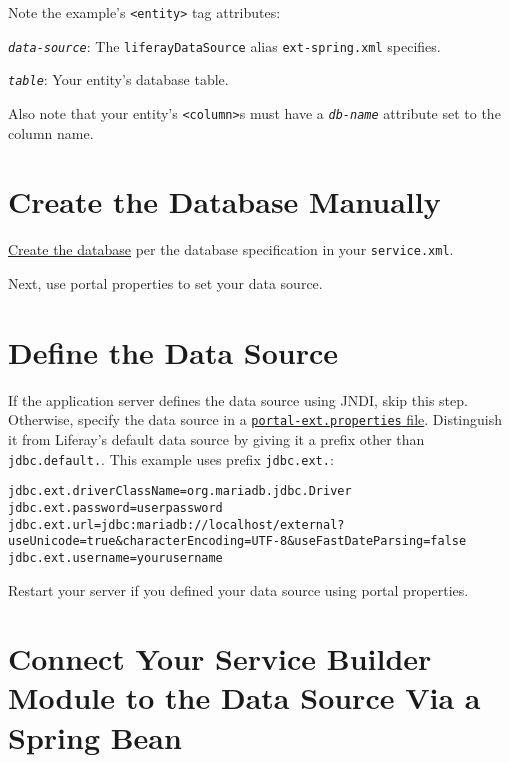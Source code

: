 Note the example's \texttt{\textless{}entity\textgreater{}} tag
attributes:

\emph{\texttt{data-source}}: The \texttt{liferayDataSource} alias
\texttt{ext-spring.xml} specifies.

\emph{\texttt{table}}: Your entity's database table.

Also note that your entity's \texttt{\textless{}column\textgreater{}}s
must have a \emph{\texttt{db-name}} attribute set to the column name.

\section{Create the Database
Manually}\label{create-the-database-manually}

\href{https://learn.liferay.com/dxp/latest/en/installation-and-upgrades/installing-liferay/configuring-a-database.html}{Create
the database} per the database specification in your
\texttt{service.xml}.

Next, use portal properties to set your data source.

\section{Define the Data Source}\label{define-the-data-source}

If the application server defines the data source using JNDI, skip this
step. Otherwise, specify the data source in a
\href{/docs/7-2/deploy/-/knowledge_base/d/portal-properties}{\texttt{portal-ext.properties}
file}. Distinguish it from Liferay's default data source by giving it a
prefix other than \texttt{jdbc.default.}. This example uses prefix
\texttt{jdbc.ext.}:

\begin{verbatim}
jdbc.ext.driverClassName=org.mariadb.jdbc.Driver
jdbc.ext.password=userpassword
jdbc.ext.url=jdbc:mariadb://localhost/external?useUnicode=true&characterEncoding=UTF-8&useFastDateParsing=false
jdbc.ext.username=yourusername
\end{verbatim}

Restart your server if you defined your data source using portal
properties.

\section{Connect Your Service Builder Module to the Data Source Via a
Spring
Bean}\label{connect-your-service-builder-module-to-the-data-source-via-a-spring-bean}

